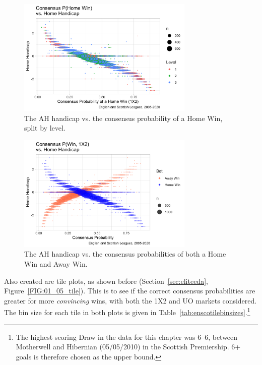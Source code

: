 \documentclass[a4paper,10pt]{report}
\begin{document}
\begin{figure}[h!]\begin{center}
		\includegraphics[width=0.75\textwidth]{ensco_05_hprob_v_hcap.png}
		\caption{The AH handicap vs. the consensus probability of a Home Win, split by level.}\label{FIG:02_02a_handicap_hprob}
\end{center}\end{figure}
\begin{figure}[h!]\begin{center}
		\includegraphics[width=0.75\textwidth]{ensco_05a_1x2_v_hcap.png}
		\caption{The AH handicap vs. the consensus probabilities of both a Home Win and Away Win.}\label{FIG:02_02b_handicap_1x2}
\end{center}\end{figure}

Also created are tile plots, as shown before (Section~\ref{sec:eliteeda}, Figure~\ref{FIG:01_05_tile}). This is to see if the correct consensus probabilities are greater for more \textit{convincing} wins, with both the 1X2 and UO markets considered. The bin size for each tile in both plots is given in Table~\ref{tab:enscotilebinsizes}.\footnote{The highest scoring Draw in the data for this chapter was 6--6, between Motherwell and Hibernian (05/05/2010) in the Scottish Premiership. 6+ goals is therefore chosen as the upper bound.}
\end{document}
